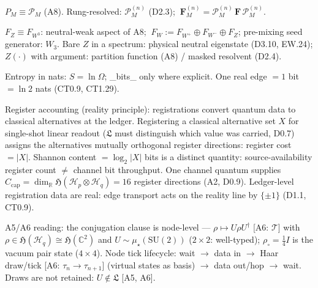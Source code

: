 \begin{convention}[{\texorpdfstring{C7}{C7}}]\label{tag:C7}
$P_M\equiv\mathcal P_M$ (A8). Rung-resolved: $\mathcal P_M^{(n)}$ (D2.3); $\ \mathbf F_M^{(n)}=\mathcal P_M^{(n)}\,\mathbf F\,\mathcal P_M^{(n)}$.

\end{convention}

\begin{convention}[{\texorpdfstring{C8}{C8}}]\label{tag:C8}
$F_Z\equiv F_{W^3}$: neutral-weak aspect of A8; $\ F_W:=F_{W^+}\oplus F_{W^-}\oplus F_Z$; pre-mixing seed generator: $W_3$. Bare $Z$ in a spectrum: physical neutral eigenstate (D3.10, EW.24); $Z(\cdot)$ with argument: partition function (A8) / masked resolvent (D2.4).

\end{convention}

\begin{convention}[{\texorpdfstring{C9}{C9}}]\label{tag:C9}
Entropy in nats: $S=\ln\Omega$; \_bits\_ only where explicit. One real edge $=1$ bit $=\ln2$ nats (CT0.9, CT1.29).

\end{convention}

\begin{convention}[{\texorpdfstring{C10}{C10}}]\label{tag:C10}
Register accounting (reality principle): registrations convert quantum data to classical alternatives at the ledger. Registering a classical alternative set $X$ for single-shot linear readout ($\mathfrak L$ must distinguish which value was carried, D0.7) assigns the alternatives mutually orthogonal register directions: register cost $=|X|$. Shannon content $=\log_2|X|$ bits is a distinct quantity: source-availability register count $\ne$ channel bit throughput. One channel quantum supplies $C_{\mathrm{cap}}=\dim_{\mathbb R}\mathfrak H(\mathcal H_p\otimes\mathcal H_q)=16$ register directions (A2, D0.9). Ledger-level registration data are real: edge transport acts on the reality line by $\{\pm1\}$ (D1.1, CT0.9).

\end{convention}

\begin{convention}[{\texorpdfstring{C11}{C11}}]\label{tag:C11}
A5/A6 reading: the conjugation clause is node-level — $\rho\mapsto U\rho U^\dagger$ [A6: $\mathcal T$] with $\rho\in\mathfrak H(\mathcal H_q)\cong\mathfrak H(\mathbb C^2)$ and $U\sim\mu_\star(\mathrm{SU}(2))$ ($2\times2$: well-typed); $\rho_\circ=\tfrac14I$ is the vacuum pair state ($4\times4$). Node tick lifecycle: wait $\to$ data in $\to$ Haar draw/tick [A6: $\tau_n\to\tau_{n+1}$] (virtual states as basis) $\to$ data out/hop $\to$ wait. Draws are not retained: $U\notin\mathfrak L$ [A5, A6].

\end{convention}

